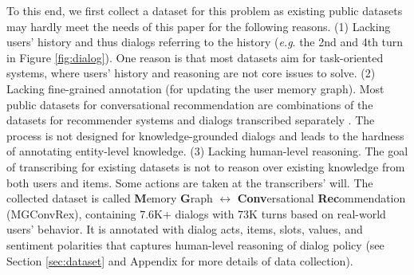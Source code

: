 \documentclass[11pt,a4paper]{article}
\makeatletter
\DeclareRobustCommand\onedot{\futurelet\@let@token\@onedot}
\def\onedot{. }
\def\eg{\emph{e.g}\onedot} \def\Eg{\emph{E.g}\onedot}
\newcommand{\todo}[1]{{\color{red}{\small\bf\sf [TO DO: #1]}}}
\makeatother
\begin{document}

To this end, we first collect a dataset for this problem as existing public datasets may hardly meet the needs of this paper for the following reasons.
(1) Lacking users' history and thus dialogs referring to the history (\eg the 2nd and 4th turn in Figure \ref{fig:dialog}).
One reason is that most datasets aim for task-oriented systems, where users' history and reasoning are not core issues to solve.
(2) Lacking fine-grained annotation (for updating the user memory graph). Most public datasets for conversational recommendation are combinations of the datasets for recommender systems and dialogs transcribed separately \cite{li2018towards,zhang2018towards}.
The process is not designed for knowledge-grounded dialogs and leads to the hardness of annotating entity-level knowledge.
(3) Lacking human-level reasoning. The goal of transcribing for existing datasets is not to reason over existing knowledge from both users and items. Some actions are taken at the transcribers' will\cite{li2018towards}.
The collected dataset is called \textbf{M}emory \textbf{G}raph $\leftrightarrow$ \textbf{Conv}ersational \textbf{Rec}ommendation (MGConvRex), containing 7.6K+ dialogs with 73K turns
based on real-world users' behavior. It is annotated with dialog acts, items, slots, values, and sentiment polarities that captures human-level reasoning of dialog policy (see Section \ref{sec:dataset} and Appendix for more details of data collection).
\end{document}
